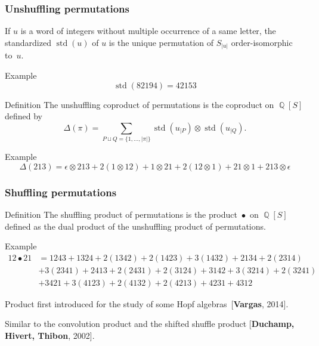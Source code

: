 \documentclass[unknownkeysallowed,10pt,xcolor={dvipsnames}]{beamer}
\DeclareMathOperator{\QQ}{\mathbb{Q}}
\DeclareMathOperator{\STD}{\mathrm{std}}
\DeclareMathOperator{\SHUFFLE}{\bullet}
\newcommand{\BIB}[2]{{\footnotesize\textcolor{MidnightBlue!85}{[\textbf{#1}, #2]}}}
\begin{document}
\begin{frame} \frametitle{Unshuffling permutations}
If $u$ is a word of integers without multiple occurrence of a same letter,
the \alert{standardized} $\STD(u)$ of $u$ is the unique permutation of
$S_{|u|}$ order-isomorphic to~$u$.

\begin{block}{Example}
\begin{equation*}
    \STD(82194) = 42153
\end{equation*}
\end{block}
\medskip

\begin{block}{Definition}
    The \alert{unshuffling coproduct of permutations} is the
    coproduct on $\QQ[S]$ defined by
    \begin{equation*}
        \Delta(\pi) =
        \sum_{P \sqcup Q = \{1, \dots, |\pi|\}}
        \STD\left(u_{|P}\right) \otimes \STD\left(u_{|Q}\right).
    \end{equation*}
\end{block}

\begin{block}{Example}
\begin{equation*}
    \Delta(213) =
    \epsilon \otimes 213 + 2 (1 \otimes 12) +
    1 \otimes 21 + 2 (12 \otimes 1) + 21 \otimes 1
    + 213 \otimes \epsilon
\end{equation*}
\end{block}
\end{frame}

\begin{frame} \frametitle{Shuffling permutations}
\begin{block}{Definition}
    The \alert{shuffling product of permutations} is the product
    $\SHUFFLE$ on $\QQ[S]$ defined as the dual product of the unshuffling
    product of permutations.
\end{block}

\begin{block}{Example}
\begin{equation*}\begin{split}
    12 \SHUFFLE 21 & =
    1243 + 1324 + 2 (1342) + 2 (1423) + 3 (1432) +
    2134 + 2 (2314) \\
    & + 3 (2341) + 2413 + 2 (2431) + 2 (3124) + 3142 +
    3 (3214) + 2 (3241) \\
    & + 3421 + 3 (4123) + 2 (4132) + 2 (4213) + 4231 + 4312
\end{split}\end{equation*}
\end{block}
\medskip

Product first introduced for the study of some Hopf algebras~\BIB{Vargas}{2014}.
\medskip

Similar to the convolution product and the shifted
shuffle product \BIB{Duchamp, Hivert, Thibon}{2002}.
\end{frame}
\end{document}
